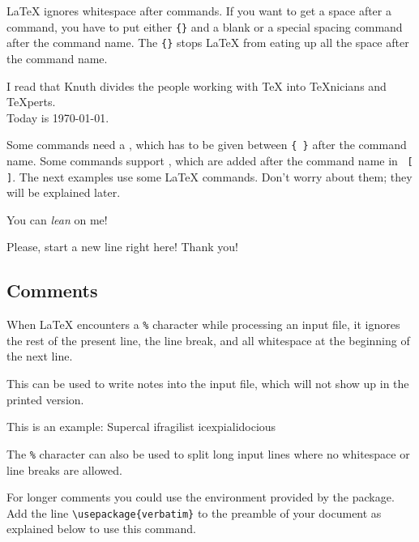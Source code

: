 %
%
\label{whitespace}

\LaTeX{} ignores whitespace after commands. If you want to get a
space after a command, you have to
put either \verb|{}| and a blank or a special spacing command after the
command name. The \verb|{}| stops \LaTeX{} from eating up all the space after
the command name. 

\begin{example}
I read that Knuth divides the 
people working with \TeX{} into 
\TeX{}nicians and \TeX perts.\\
Today is \today.
\end{example}

Some commands need a , which has to be given between
 \verb|{ }| after the command name. Some commands support
, which are added after the command name in
~\verb|[ ]|. The next examples use some \LaTeX{}
commands. Don't worry about them; they will be explained later.

\begin{example}
You can \textsl{lean} on me!
\end{example}
\begin{example}
Please, start a new line
right here!\newline
Thank you!
\end{example}

\subsection{Comments}

When \LaTeX{} encounters a \verb|%| character while processing an input file,
it ignores the rest of the present line, the line break, and all
whitespace at the beginning of the next line.

This can be used to write notes into the input file, which will not show up
in the printed version.

\begin{example}
This is an %
example: Supercal%
              ifragilist%
    icexpialidocious
\end{example}

The \texttt{\%} character can also be used to split long input lines where no
whitespace or line breaks are allowed.

For longer comments you could use the  environment
provided by the  package. Add the
line \verb|\usepackage{verbatim}| to the preamble of your document as
explained below to use this command.

